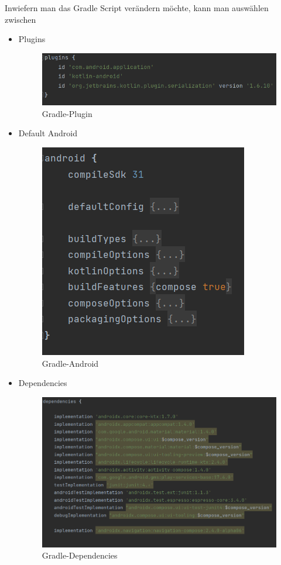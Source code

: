 Inwiefern man das Gradle Script verändern möchte, kann man auswählen zwischen
\begin{itemize}
    \item Plugins
    \begin{figure}[htp]
        \author{Bozidar Spasenovic}
        \centering
        \includegraphics[scale=0.80]{pics/gradle-plugins.PNG}
        \caption{Gradle-Plugin}
        \label{fig:impl:gradle-plugin}
    \end{figure}   
    \item Default Android
    \begin{figure}[htp]
        \author{Bozidar Spasenovic}
        \centering
        \includegraphics[scale=0.80]{pics/gradle-android.PNG}
        \caption{Gradle-Android}
        \label{fig:impl:gradle-android}
    \end{figure}   
    \item Dependencies
    \begin{figure}[htp]
        \author{Bozidar Spasenovic}
        \centering
        \includegraphics[scale=0.50]{pics/gradle-dependencies.PNG}
        \caption{Gradle-Dependencies}
        \label{fig:impl:gradle-Dependencies}
    \end{figure}   
\end{itemize}
